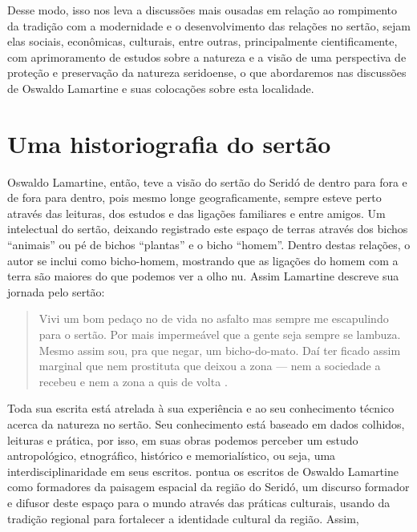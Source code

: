 \begin{refsection}
    Desse modo, isso nos leva a discussões mais ousadas em relação ao rompimento da tradição com a modernidade e o desenvolvimento das relações no sertão, sejam elas sociais, econômicas, culturais, entre outras, principalmente cientificamente, com aprimoramento de estudos sobre a natureza e a visão de uma perspectiva de proteção e preservação da natureza seridoense, o que abordaremos nas discussões de Oswaldo Lamartine e suas colocações sobre esta localidade. 


    \section{Uma historiografia do sertão}

    Oswaldo Lamartine, então, teve a visão do sertão do Seridó de dentro para fora e de fora para dentro, pois mesmo longe geograficamente, sempre esteve perto através das leituras, dos estudos e das ligações familiares e entre amigos. Um intelectual do sertão, deixando registrado este espaço de terras através dos bichos “animais” ou pé de bichos “plantas” e o bicho “homem”. Dentro destas relações, o autor se inclui como bicho-homem, mostrando que as ligações do homem com a terra são maiores do que podemos ver a olho nu. Assim Lamartine descreve sua jornada pelo sertão: 

    \begin{quotation}
        Vivi um bom pedaço no de vida no asfalto mas sempre me escapulindo para o sertão. Por mais impermeável que a gente seja sempre se lambuza. Mesmo assim sou, pra que negar, um bicho-do-mato. Daí ter ficado assim marginal que nem prostituta que deixou a zona --- nem a sociedade a recebeu e nem a zona a quis de volta \cite[LAMARTINE apud][p.~39]{CAMPOS2001alpendres}. 
    \end{quotation}

    Toda sua escrita está atrelada à sua experiência e ao seu conhecimento técnico acerca da natureza no sertão. Seu conhecimento está baseado em dados colhidos, leituras e prática, por isso, em suas obras podemos perceber um estudo antropológico, etnográfico, histórico e memorialístico, ou seja, uma interdisciplinaridade em seus escritos. \textcite{MEDEIROSNETA2007Sertão} pontua os escritos de Oswaldo Lamartine como formadores da paisagem espacial da região do Seridó, um discurso formador e difusor deste espaço para o mundo através das práticas culturais, usando da tradição regional para fortalecer a identidade cultural da região. Assim, 


\end{refsection}
